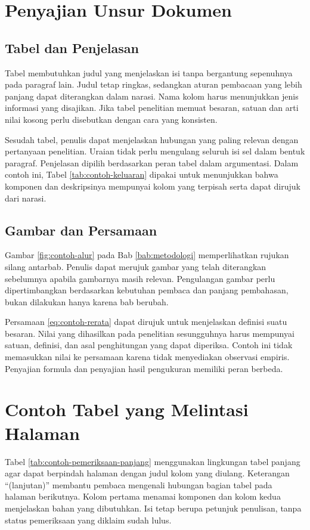 \section{Penyajian Unsur Dokumen}

\subsection{Tabel dan Penjelasan}

Tabel membutuhkan judul yang menjelaskan isi tanpa bergantung sepenuhnya pada paragraf lain. Judul tetap ringkas, sedangkan aturan pembacaan yang lebih panjang dapat diterangkan dalam narasi. Nama kolom harus menunjukkan jenis informasi yang disajikan. Jika tabel penelitian memuat besaran, satuan dan arti nilai kosong perlu disebutkan dengan cara yang konsisten.

Sesudah tabel, penulis dapat menjelaskan hubungan yang paling relevan dengan pertanyaan penelitian. Uraian tidak perlu mengulang seluruh isi sel dalam bentuk paragraf. Penjelasan dipilih berdasarkan peran tabel dalam argumentasi. Dalam contoh ini, Tabel \ref{tab:contoh-keluaran} dipakai untuk menunjukkan bahwa komponen dan deskripsinya mempunyai kolom yang terpisah serta dapat dirujuk dari narasi.

\subsection{Gambar dan Persamaan}

Gambar \ref{fig:contoh-alur} pada Bab \ref{bab:metodologi} memperlihatkan rujukan silang antarbab. Penulis dapat merujuk gambar yang telah diterangkan sebelumnya apabila gambarnya masih relevan. Pengulangan gambar perlu dipertimbangkan berdasarkan kebutuhan pembaca dan panjang pembahasan, bukan dilakukan hanya karena bab berubah.

Persamaan \ref{eq:contoh-rerata} dapat dirujuk untuk menjelaskan definisi suatu besaran. Nilai yang dihasilkan pada penelitian sesungguhnya harus mempunyai satuan, definisi, dan asal penghitungan yang dapat diperiksa. Contoh ini tidak memasukkan nilai ke persamaan karena tidak menyediakan observasi empiris. Penyajian formula dan penyajian hasil pengukuran memiliki peran berbeda.

\section{Contoh Tabel yang Melintasi Halaman}

Tabel \ref{tab:contoh-pemeriksaan-panjang} menggunakan lingkungan tabel panjang agar dapat berpindah halaman dengan judul kolom yang diulang. Keterangan ``(lanjutan)'' membantu pembaca mengenali hubungan bagian tabel pada halaman berikutnya. Kolom pertama menamai komponen dan kolom kedua menjelaskan bahan yang dibutuhkan. Isi tetap berupa petunjuk penulisan, tanpa status pemeriksaan yang diklaim sudah lulus.

